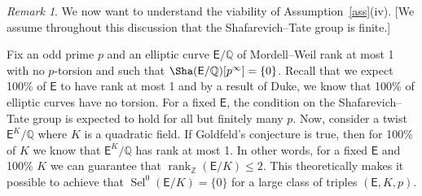 \documentclass{amsart}
\numberwithin{equation}{section}
\theoremstyle{remark}
\newtheorem{remark}[theorem]{Remark}
\newcommand{\Sel}{\operatorname{Sel}}
\newcommand{\rk}{\operatorname{rank}}
\newcommand{\Z}{\mathbb{Z}}
\newcommand{\Q}{\mathbb{Q}}
\newcommand{\EC}{\mathsf{E}}
\theoremstyle{plain} %
\begin{document}
\begin{remark}
We now want to understand the viability of Assumption~\ref{ass}(iv).
[We assume throughout this discussion that the Shafarevich--Tate group is finite.]

Fix an odd prime $p$ and an elliptic curve $\EC/\Q$ of Mordell--Weil rank at most 1 with no $p$-torsion and such that $\Sha(\EC/\Q)[p^\infty]=\{0\}$.
Recall that we expect 100\% of $\EC$ to have rank at most 1 and by a result of Duke, we know that 100\% of elliptic curves have no torsion.
For a fixed $\EC$, the condition on the Shafarevich--Tate group is expected to hold for all but finitely many $p$.
Now, consider a twist $\EC^K/\Q$ where $K$ is a quadratic field.
If Goldfeld's conjecture is true, then for 100\% of $K$ we know that $\EC^K/\Q$ has rank at most 1.
In other words, for a fixed $\EC$ and 100\% $K$ we can guarantee that $\rk_{\Z}(\EC/K) \leq 2$.
This theoretically makes it possible to achieve that $\Sel^0(\EC/K) =\{0\}$ for a large class of triples $(\EC, K, p)$.


\end{remark}
\end{document}
